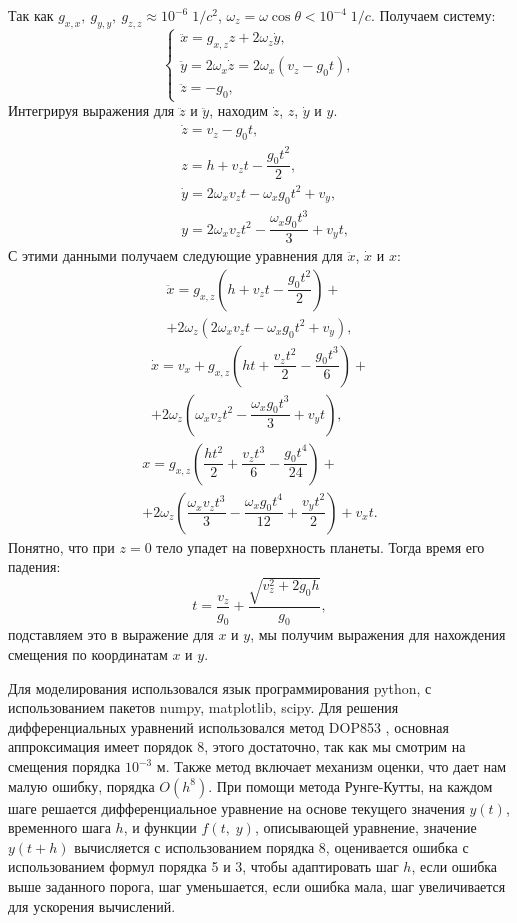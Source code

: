 \documentclass[hoptionsi, twocolumn]{revtex4-2}
\begin{document}
Так как $g_{x, x},\ g_{y, y},\ g_{z, z}\approx 10^{-6}\;1/c^2$, $\omega_z=\omega\cos{\theta}< 10^{-4}\;1/c$. Получаем систему:
\begin{equation*}
    \begin{cases}
    \ddot{x} = g_{x,z}z+2\omega_{z}\dot{y},  \\
    \ddot{y} =2\omega_{x}\dot{z}=2\omega_{x}\left(v_z-g_0t\right),\\
     \ddot{z} = - g_0,
    \end{cases}
\end{equation*}
Интегрируя выражения для $\ddot z$ и $\ddot y$, находим $\dot z$, $z$, $\dot y$ и $y$.
\begin{equation*}
    \begin{aligned}
    & \dot z = v_z-g_0t,\\
    &z = h+v_zt-\dfrac{g_0t^2}{2},\\
    &\dot y = 2\omega_x v_z t-\omega_x g_0t^2+v_y,\\
    &y= 2\omega_x v_z t^2-\dfrac{\omega_x g_0t^3}{3} +v_yt,
    \end{aligned}
\end{equation*}
С этими данными получаем следующие уравнения для $\ddot x$, $\dot x$ и $x$:
\begin{multline*}
    \ddot{x} = g_{x,z}\left(h+v_zt-\dfrac{g_0t^2}{2}\right)+\\
    +2\omega_{z}\left(2\omega_x v_z t-\omega_x g_0t^2 + v_y\right),
\end{multline*}
\begin{multline*}
    \dot{x} = v_x+g_{x,z}\left(ht+\dfrac{v_zt^2}{2}-\dfrac{g_0t^3}{6}\right)+\\
    +2\omega_{z}\left(\omega_x v_z t^2-\dfrac{\omega_x g_0t^3}{3} + v_yt\right),
\end{multline*}
\begin{multline*}
    x=g_{x,z}\left(\dfrac{ht^2}{2}+\dfrac{v_zt^3}{6}-\dfrac{g_0t^4}{24}\right)+\\
    +2\omega_{z}\left(\dfrac{\omega_x v_z t^3}{3}-\dfrac{\omega_x g_0t^4}{12} + \dfrac{v_yt^2}{2}\right)+v_xt.
\end{multline*}
Понятно, что при $z=0$ тело упадет на поверхность планеты. Тогда время его падения:
\[
t=\dfrac{v_z}{g_0}+\dfrac{\sqrt{v_z^2+2g_0h}}{g_0},
\]
подставляем это в выражение для $x$ и $y$, мы получим выражения для нахождения смещения по координатам $x$ и $y$.

Для моделирования использовался язык программирования python, с использованием пакетов numpy, matplotlib, scipy. Для решения дифференциальных уравнений использовался метод DOP853 \cite{dop853}, основная аппроксимация имеет порядок 8, этого достаточно, так как мы смотрим на смещения порядка $10^{-3}$ м. Также метод включает механизм оценки, что дает нам малую ошибку, порядка $O(h^8)$. При помощи метода Рунге-Кутты, на каждом шаге решается дифференциальное уравнение на основе текущего значения $y(t)$, временного шага $h$, и функции $f(t,\;y)$, описывающей уравнение, значение $y(t+h)$ вычисляется с использованием порядка 8, оценивается ошибка с использованием формул порядка 5 и 3, чтобы адаптировать шаг $h$, если ошибка выше заданного порога, шаг уменьшается, если ошибка мала, шаг увеличивается для ускорения вычислений.\onecolumngrid
\end{document}
